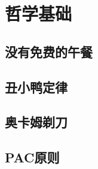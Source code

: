 \chapter{哲学基础} %
\label{cha:哲学基础}
\section{没有免费的午餐} %
\label{sec:没有免费的午餐}


\section{丑小鸭定律} %
\label{sec:丑小鸭定律}


\section{奥卡姆剃刀} %
\label{sec:奥卡姆剃刀}


\section{PAC原则} %
\label{sec:pac原则}



